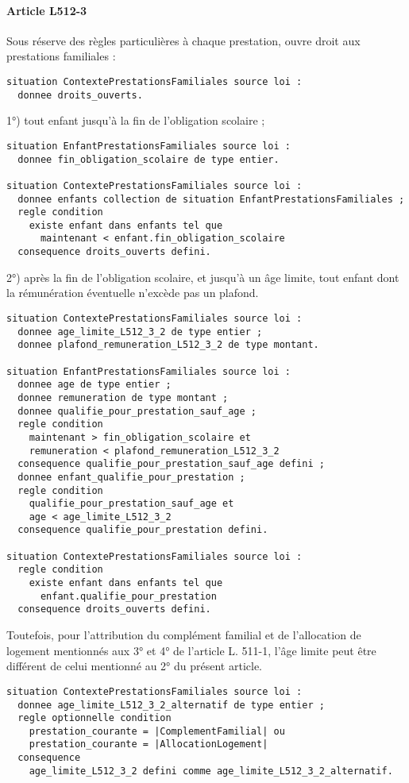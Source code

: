 \documentclass[11pt, french]{article}
\begin{document}
\paragraph{Article L512-3} Sous réserve des règles particulières à chaque prestation, ouvre droit aux prestations familiales :
\begin{lstlisting}
situation ContextePrestationsFamiliales source loi :
  donnee droits_ouverts.
\end{lstlisting}
1°) tout enfant jusqu'à la fin de l'obligation scolaire ;
\begin{lstlisting}
situation EnfantPrestationsFamiliales source loi :
  donnee fin_obligation_scolaire de type entier.

situation ContextePrestationsFamiliales source loi :
  donnee enfants collection de situation EnfantPrestationsFamiliales ;
  regle condition
    existe enfant dans enfants tel que
      maintenant < enfant.fin_obligation_scolaire
  consequence droits_ouverts defini.
\end{lstlisting}
2°) après la fin de l'obligation scolaire, et jusqu'à un âge limite, tout enfant dont la rémunération éventuelle n'excède pas un plafond.
\begin{lstlisting}
situation ContextePrestationsFamiliales source loi :
  donnee age_limite_L512_3_2 de type entier ;
  donnee plafond_remuneration_L512_3_2 de type montant.

situation EnfantPrestationsFamiliales source loi :
  donnee age de type entier ;
  donnee remuneration de type montant ;
  donnee qualifie_pour_prestation_sauf_age ;
  regle condition
    maintenant > fin_obligation_scolaire et
    remuneration < plafond_remuneration_L512_3_2
  consequence qualifie_pour_prestation_sauf_age defini ;
  donnee enfant_qualifie_pour_prestation ;
  regle condition
    qualifie_pour_prestation_sauf_age et
    age < age_limite_L512_3_2
  consequence qualifie_pour_prestation defini.

situation ContextePrestationsFamiliales source loi :
  regle condition
    existe enfant dans enfants tel que
      enfant.qualifie_pour_prestation
  consequence droits_ouverts defini.
\end{lstlisting}
Toutefois, pour l'attribution du complément familial et de l'allocation de logement mentionnés aux 3° et 4° de l'article L. 511-1, l'âge limite peut être différent de celui mentionné au 2° du présent article.
\begin{lstlisting}
situation ContextePrestationsFamiliales source loi :
  donnee age_limite_L512_3_2_alternatif de type entier ;
  regle optionnelle condition
    prestation_courante = |ComplementFamilial| ou
    prestation_courante = |AllocationLogement|
  consequence
    age_limite_L512_3_2 defini comme age_limite_L512_3_2_alternatif.
\end{lstlisting}
\end{document}
